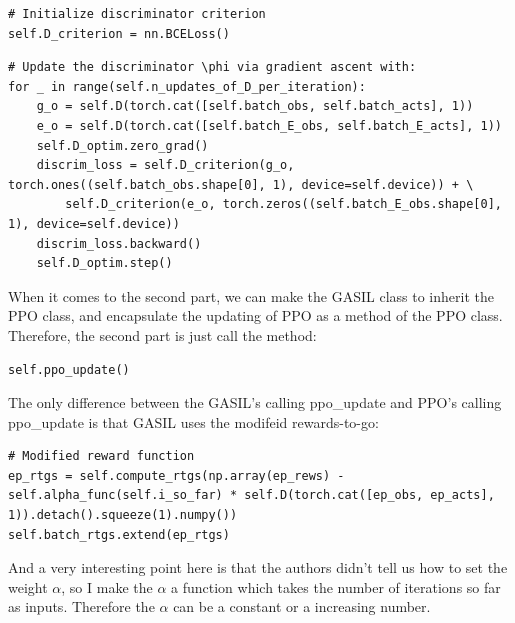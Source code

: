 \documentclass[UTF8, a4paper, 11pt]{article}
\begin{document}
\begin{lstlisting}
# Initialize discriminator criterion
self.D_criterion = nn.BCELoss()
\end{lstlisting}
\begin{lstlisting}
# Update the discriminator \phi via gradient ascent with:
for _ in range(self.n_updates_of_D_per_iteration):
    g_o = self.D(torch.cat([self.batch_obs, self.batch_acts], 1))
    e_o = self.D(torch.cat([self.batch_E_obs, self.batch_E_acts], 1))
    self.D_optim.zero_grad()
    discrim_loss = self.D_criterion(g_o, torch.ones((self.batch_obs.shape[0], 1), device=self.device)) + \
        self.D_criterion(e_o, torch.zeros((self.batch_E_obs.shape[0], 1), device=self.device))
    discrim_loss.backward()
    self.D_optim.step()
\end{lstlisting}
When it comes to the second part, we can make the GASIL class to inherit the PPO class, and encapsulate the updating of PPO as a method of the PPO class. Therefore,
the second part is just call the method:
\begin{lstlisting}
self.ppo_update()
\end{lstlisting}
The only difference between the GASIL's calling ppo\_update and PPO's calling ppo\_update is that GASIL uses the modifeid rewards-to-go:
\begin{lstlisting}
# Modified reward function
ep_rtgs = self.compute_rtgs(np.array(ep_rews) - self.alpha_func(self.i_so_far) * self.D(torch.cat([ep_obs, ep_acts], 1)).detach().squeeze(1).numpy())
self.batch_rtgs.extend(ep_rtgs)
\end{lstlisting}
And a very interesting point here is that the authors didn't tell us how to set the weight $\alpha$, so I make the $\alpha$ a function which takes the number of
iterations so far as inputs. Therefore the $\alpha$ can be a constant or a increasing number.
\end{document}
